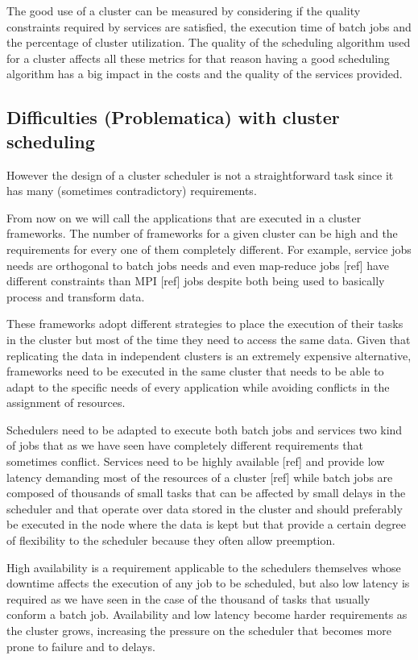 \documentclass{svjour3}                     %
\begin{document}
The good use of a cluster can be measured by considering if the
quality constraints required by services are satisfied, the execution
time of batch jobs and the percentage of cluster utilization. The
quality of the scheduling algorithm used for a cluster affects all
these metrics for that reason having a good scheduling algorithm has a big
impact in the costs and the quality of the services provided.

\subsection{Difficulties (Problematica) with cluster scheduling}

However the design of a cluster scheduler is not a straightforward
task since it has many (sometimes contradictory) requirements.

From now on we will call the applications that are executed in a cluster frameworks.
The number of frameworks for a given cluster can be high and the
requirements for every one of them completely different. For example,
service jobs needs are orthogonal to batch jobs needs and even
map-reduce jobs [ref] have different constraints than MPI [ref]
jobs despite both being used to basically process and transform
data.

These frameworks adopt different strategies to place the
execution of their tasks in the cluster but most of the
time they need to access the same data. Given that replicating the
data in independent clusters is an extremely expensive alternative, frameworks
need to be executed in the same cluster that needs to be able to adapt
to the specific needs of every application while avoiding conflicts in
the assignment of resources.

Schedulers need to be adapted to execute both batch jobs and services
two kind of jobs that as we have seen have completely different
requirements that sometimes conflict. Services need to be highly
available [ref] and provide low latency demanding most of the
resources of a cluster [ref] while batch jobs are composed of thousands of small
tasks that can be affected by small delays in the scheduler and that
operate over data stored in the cluster and should
preferably be executed in the node where the data is kept but that
provide a certain degree of flexibility to the scheduler because they
often allow preemption.

High availability is a requirement applicable to the schedulers
themselves whose downtime affects the execution of any job to be
scheduled, but also low latency is required as we have seen in the
case of the thousand of tasks that usually conform a batch
job. Availability and low latency become harder requirements as the
cluster grows, increasing the pressure on the scheduler that becomes
more prone to failure and to delays.
\end{document}
